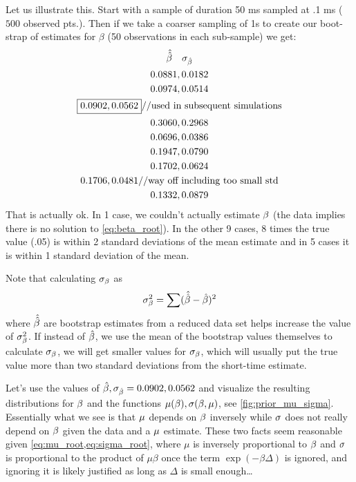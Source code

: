 Let us illustrate this. Start with a sample of duration 50 ms sampled at .1 ms ($500$ observed pts.). Then if we
take a coarser sampling of 1s to create our boot-strap of estimates for $\beta$
(50 observations in each sub-sample) we get:
\begin{equation*}
\begin{gathered}
\hat {\hat \beta} \quad \sigma_{\hat{\beta}} \\
0.0881, 0.0182\\
0.0974, 0.0514\\
\boxed{0.0902, 0.0562} // \textrm{used in subsequent simulations}\\
0.3060, 0.2968\\
0.0696, 0.0386\\
0.1947, 0.0790\\
0.1702, 0.0624\\
0.1706, 0.0481  // \textrm{way off including too small std}\\
 0.1332, 0.0879\\
\end{gathered}
\end{equation*}
That is actually ok. In 1 case, we couldn't actually estimate $\beta$ (the data
implies there is no solution to \cref{eq:beta_root}). In the other 9 cases, 8
times the true value (.05) is within 2 standard deviations of the mean estimate
and in 5 cases it is within 1 standard deviation of the mean.

Note that calculating $\sigma_\beta$ as $$ \sigma_\beta^2 = \sum(\hat{ \hat {\beta}} - \hat {\beta})^2
$$ where $\hat{ \hat {\beta}}$ are bootstrap estimates from a reduced data set helps
increase the value of $\sigma_\beta^2$. If instead of $\hat {\beta}$, we use the mean of the
bootstrap values themselves to calculate $\sigma_\beta$, we will get smaller values for
$\sigma_\beta$, which will usually put the true value more than two standard deviations
from the short-time estimate.

Let's use the values of $\hat \beta, \sigma_{\hat{\beta}} =  0.0902, 0.0562$ and
visualize the resulting distributions for $\beta$ and the functions ${\mu }(\beta),
\sigma(\beta, {\mu })$, see \cref{fig:prior_mu_sigma}. Essentially what we see is that ${\mu }$
depends on $\beta$ inversely while $\sigma$ does not really depend on $\beta$ given the
data and a ${\mu }$ estimate. These two facts seem reasonable given
\cref{eq:mu_root,eq:sigma_root}, where $\mu$ is inversely proportional to
$\beta$ and $\sigma$ is proportional to the product of $\mu \beta$ once the term
$\exp(-\beta \Delta)$ is ignored, and ignoring it is likely justified as long as
$\Delta$ is small enough\ldots

